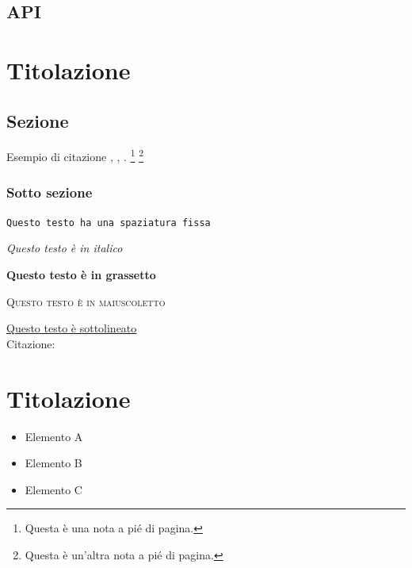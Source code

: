\documentclass[twoside]{supsistudent}
\begin{document}
\section{API}


\chapter{Titolazione}

\lipsum[13]

\section{Sezione}

\lipsum[23]
Esempio di citazione \cite{4538384}, \cite{5357331,4523385}, \cite{1705631}.
\footnote{Questa \`e una nota a pi\'e di pagina.}
\footnote{Questa \`e un'altra nota a pi\'e di pagina.}
\lipsum[23]

\subsection{Sotto sezione}

\texttt{Questo testo ha una spaziatura fissa}

\textit{Questo testo \`e in italico}

\textbf{Questo testo \`e in grassetto}

\textsc{Questo testo \`e in maiuscoletto}

\underline{Questo testo \`e sottolineato} \\

Citazione:
\begin{quote}
\lipsum[23]
\end{quote}

\chapter{Titolazione}

\lipsum[13]

\begin{itemize}
  \item Elemento A
  \item Elemento B
  \item Elemento C
\end{itemize}

%
\end{document}
